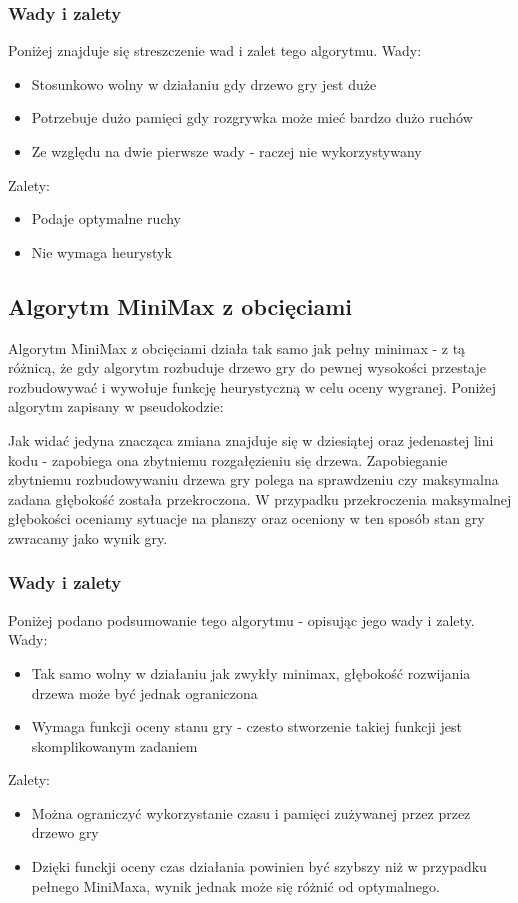 \documentclass[polish,shortabstract,inz]{iithesis}
\begin{document}
\bigskip


\subsubsection{Wady i zalety}
Poniżej znajduje się streszczenie wad i zalet tego algorytmu.
\newline Wady:
\begin{itemize}
  \item Stosunkowo wolny w działaniu gdy drzewo gry jest duże
  \item Potrzebuje dużo pamięci gdy rozgrywka może mieć bardzo dużo ruchów
  \item Ze względu na dwie pierwsze wady - raczej nie wykorzystywany
\end{itemize}
Zalety:
\begin{itemize}
  \item Podaje optymalne ruchy
  \item Nie wymaga heurystyk
\end{itemize}


\subsection{Algorytm MiniMax z obcięciami}
Algorytm MiniMax z obcięciami działa tak samo jak pełny minimax - z tą różnicą, że gdy algorytm rozbuduje drzewo gry do pewnej wysokości przestaje rozbudowywać i wywołuje funkcję heurystyczną w celu oceny wygranej.
Poniżej algorytm zapisany w pseudokodzie:

\newpage

Jak widać jedyna znacząca zmiana znajduje się w dziesiątej oraz jedenastej lini kodu - zapobiega ona zbytniemu rozgałęzieniu się drzewa.
Zapobieganie zbytniemu rozbudowywaniu drzewa gry polega na sprawdzeniu czy maksymalna zadana głębokość została przekroczona.
W przypadku przekroczenia maksymalnej głębokości oceniamy sytuacje na planszy oraz oceniony w ten sposób stan gry zwracamy jako wynik gry.

\subsubsection{Wady i zalety}
Poniżej podano podsumowanie tego algorytmu - opisując jego wady i zalety.
\newline Wady:
\begin{itemize}
  \item Tak samo wolny w działaniu jak zwykły minimax, głębokość rozwijania drzewa może być jednak ograniczona
  \item Wymaga funkcji oceny stanu gry - czesto stworzenie takiej funkcji jest skomplikowanym zadaniem
\end{itemize}
Zalety:
\begin{itemize}
  \item Można ograniczyć wykorzystanie czasu i pamięci zużywanej przez przez drzewo gry
  \item Dzięki funckji oceny czas działania powinien być szybszy niż w przypadku pełnego MiniMaxa, wynik jednak może się różnić od optymalnego.
\end{itemize}
\end{document}
